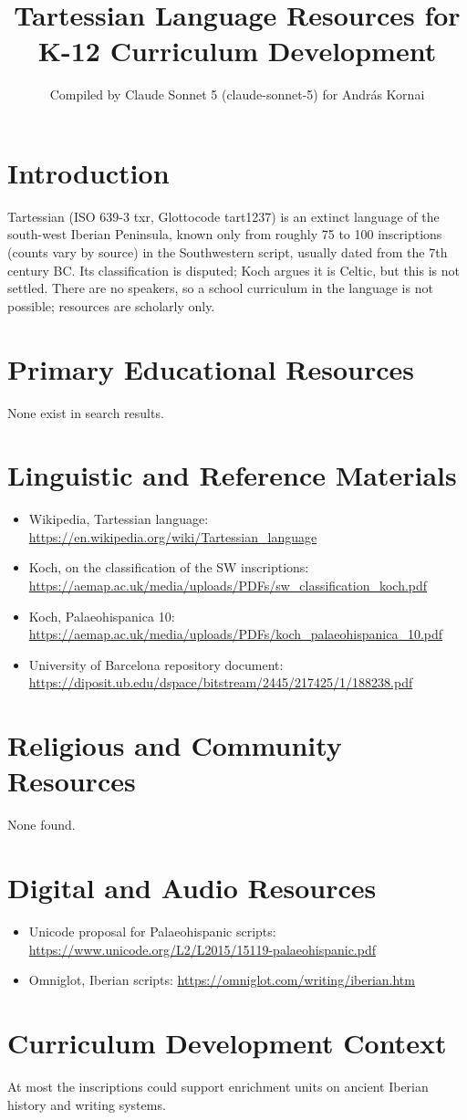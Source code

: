\documentclass[12pt]{article}
\title{Tartessian Language Resources for K-12 Curriculum Development}
\author{Compiled by Claude Sonnet 5 (claude-sonnet-5) for Andr\'as Kornai}
\date{}
\begin{document}
\maketitle
\section{Introduction}
Tartessian (ISO 639-3 txr, Glottocode tart1237) is an extinct language of the south-west Iberian Peninsula, known only from roughly 75 to 100 inscriptions (counts vary by source) in the Southwestern script, usually dated from the 7th century BC. Its classification is disputed; Koch argues it is Celtic, but this is not settled. There are no speakers, so a school curriculum in the language is not possible; resources are scholarly only.
\section{Primary Educational Resources}
None exist in search results.
\section{Linguistic and Reference Materials}
\begin{itemize}
\item Wikipedia, Tartessian language: \url{https://en.wikipedia.org/wiki/Tartessian_language}
\item Koch, on the classification of the SW inscriptions: \url{https://aemap.ac.uk/media/uploads/PDFs/sw_classification_koch.pdf}
\item Koch, Palaeohispanica 10: \url{https://aemap.ac.uk/media/uploads/PDFs/koch_palaeohispanica_10.pdf}
\item University of Barcelona repository document: \url{https://diposit.ub.edu/dspace/bitstream/2445/217425/1/188238.pdf}
\end{itemize}
\section{Religious and Community Resources}
None found.
\section{Digital and Audio Resources}
\begin{itemize}
\item Unicode proposal for Palaeohispanic scripts: \url{https://www.unicode.org/L2/L2015/15119-palaeohispanic.pdf}
\item Omniglot, Iberian scripts: \url{https://omniglot.com/writing/iberian.htm}
\end{itemize}
\section{Curriculum Development Context}
At most the inscriptions could support enrichment units on ancient Iberian history and writing systems.
\end{document}
